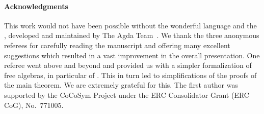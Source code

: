 \paragraph*{Acknowledgments}
This work would not have been possible without the wonderful \agda language and
the \agdastdlib, developed and maintained by The Agda Team~\cite{agdastdlib}.
We thank the three anonymous referees for carefully reading the manuscript and
offering many excellent suggestions which resulted in a vast improvement in the
overall presentation.  One referee went above and beyond and provided us with a
simpler formalization of free algebras, in particular of .
This in turn led to simplifications of the proofs of the main theorem. We are
extremely grateful for this.
The first author was supported by the CoCoSym Project
under the ERC Consolidator Grant (ERC CoG), No.~771005.




